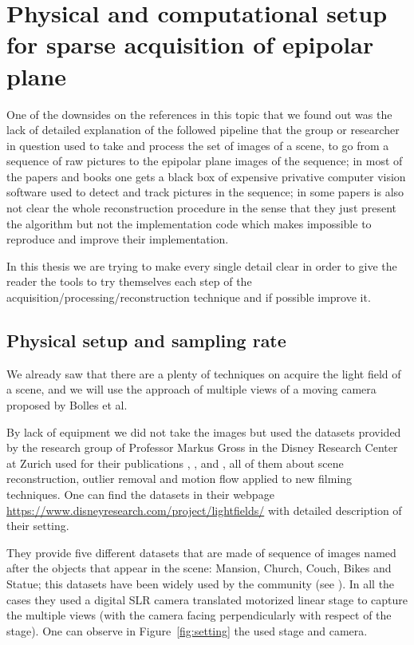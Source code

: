 \section{Physical and computational setup for sparse acquisition of epipolar plane}
\label{sec:Sparse-acquisition}

One of the downsides on the references in this topic that we found out was the lack of detailed explanation of the followed pipeline that the group or researcher in question used to take and process the set of images of a scene, to go from a sequence of raw pictures to the epipolar plane images of the sequence; in most of the papers and books one gets a black box of expensive privative computer vision software used to detect and track pictures in the sequence; in some papers is also not clear the whole reconstruction procedure in the sense that they just present the algorithm but not the implementation code which makes impossible to reproduce and improve their implementation.

\bigskip

In this thesis we are trying to make every single detail clear in order to give the reader the tools to try themselves each step of the acquisition/processing/reconstruction technique and if possible improve it. 

\subsection{Physical setup and sampling rate}
\label{sec:phys_setup_sampling_rate}

We already saw that there are a plenty of techniques on acquire the light field of a scene, and we will use the approach of multiple views of a moving camera proposed by Bolles et al.\ 

\bigskip 

By lack of equipment we did not take the images but used the datasets provided by the research group of Professor Markus Gross in the Disney Research Center at Zurich used for their publications \cite{ChangilPhD}, \cite{PointCloud}, \cite{SceneRec} and \cite{StructMot}, all of them about scene reconstruction, outlier removal and motion flow applied to new filming techniques. One can find the datasets in their webpage \url{https://www.disneyresearch.com/project/lightfields/} with detailed description of their setting. 

\bigskip

They provide five different datasets that are made of sequence of images named after the objects that appear in the scene: Mansion, Church, Couch, Bikes and Statue; this datasets have been widely used by the community (see \cite{LF-Shearlets}). In all the cases they used a digital SLR camera translated motorized linear stage to capture the multiple views (with the camera facing perpendicularly with respect of the stage). One can observe in Figure~\ref{fig:setting} the used stage and camera.

